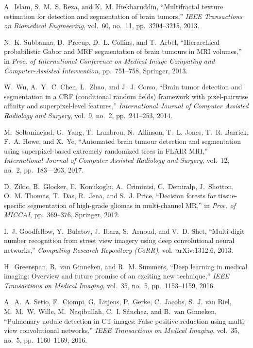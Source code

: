 \documentclass[journal,twocolumn]{IEEEtran}
\begin{document}
\begin{thebibliography}{10}
A.~Islam, S.~M.~S. Reza, and K.~M. Iftekharuddin, ``{Multifractal texture
  estimation for detection and segmentation of brain tumors},'' {\em IEEE
  Transactions on Biomedical Engineering}, vol.~60, no.~11, pp.~3204--3215,
  2013.

N.~K. Subbanna, D.~Precup, D.~L. Collins, and T.~Arbel, ``{Hierarchical
  probabilistic Gabor and MRF segmentation of brain tumours in MRI volumes},''
  in {\em Proc. of International Conference on Medical Image Computing and
  Computer-Assisted Intervention}, pp.~751--758, Springer, 2013.

W.~Wu, A.~Y.~C. Chen, L.~Zhao, and J.~J. Corso, ``{Brain tumor detection and
  segmentation in a CRF (conditional random fields) framework with
  pixel-pairwise affinity and superpixel-level features},'' {\em International
  Journal of Computer Assisted Radiology and Surgery}, vol.~9, no.~2,
  pp.~241--253, 2014.

M.~Soltaninejad, G.~Yang, T.~Lambrou, N.~Allinson, T.~L. Jones, T.~R. Barrick,
  F.~A. Howe, and X.~Ye, ``{Automated brain tumour detection and segmentation
  using superpixel-based extremely randomized trees in FLAIR MRI},'' {\em
  International Journal of Computer Assisted Radiology and Surgery}, vol.~12,
  no.~2, pp.~183--–203, 2017.

D.~Zikic, B.~Glocker, E.~Konukoglu, A.~Criminisi, C.~Demiralp, J.~Shotton,
  O.~M. Thomas, T.~Das, R.~Jena, and S.~J. Price, ``{Decision forests for
  tissue-specific segmentation of high-grade gliomas in multi-channel MR},'' in
  {\em Proc. of MICCAI}, pp.~369--376, Springer, 2012.

I.~J. Goodfellow, Y.~Bulatov, J.~Ibarz, S.~Arnoud, and V.~D. Shet,
  ``Multi-digit number recognition from street view imagery using deep
  convolutional neural networks,'' {\em Computing Research Repository
  {(CoRR)}}, vol.~arXiv:1312.6, 2013.

H.~Greenspan, B.~van Ginneken, and R.~M. Summers, ``Deep learning in medical
  imaging: {O}verview and future promise of an exciting new technique,'' {\em
  IEEE Transactions on Medical Imaging}, vol.~35, no.~5, pp.~1153--1159, 2016.

A.~A.~A. Setio, F.~Ciompi, G.~Litjens, P.~Gerke, C.~Jacobs, S.~J. van Riel,
  M.~M.~W. Wille, M.~Naqibullah, C.~I. S{\'{a}}nchez, and B.~van Ginneken,
  ``{Pulmonary nodule detection in CT images: False positive reduction using
  multi-view convolutional networks},'' {\em IEEE Transactions on Medical
  Imaging}, vol.~35, no.~5, pp.~1160--1169, 2016.


\end{thebibliography}
\end{document}
